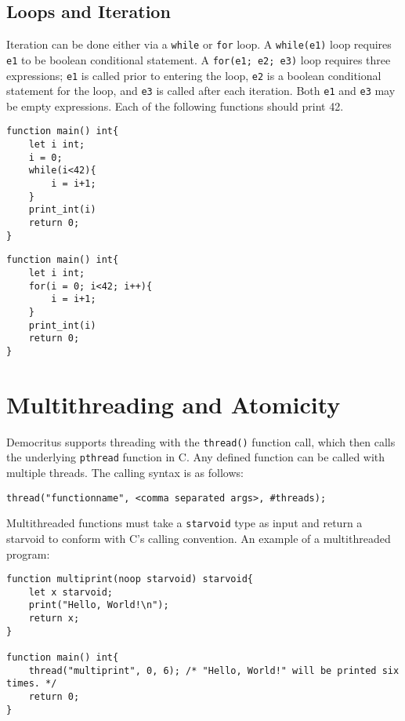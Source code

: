	\subsection{Loops and Iteration}
		Iteration can be done either via a \texttt{while} or \texttt{for} loop. A \texttt{while(e1)} loop requires \texttt{e1} to be boolean conditional statement. A \texttt{for(e1; e2; e3)} loop requires three expressions; \texttt{e1} is called prior to entering the loop, \texttt{e2} is a boolean conditional statement for the loop, and \texttt{e3} is called after each iteration. Both \texttt{e1} and \texttt{e3} may be empty expressions. Each of the following functions should print 42.

		\begin{lstlisting}
function main() int{
	let i int;
	i = 0;
	while(i<42){
		i = i+1;
	}
	print_int(i)
	return 0;
}
		\end{lstlisting}

		\begin{lstlisting}
function main() int{
	let i int;
	for(i = 0; i<42; i++){
		i = i+1;
	}
	print_int(i)
	return 0;
}
		\end{lstlisting}



\section{Multithreading and Atomicity}
	Democritus supports threading with the \texttt{thread()} function call, which then calls the underlying \texttt{pthread} function in C. Any defined function can be called with multiple threads. The calling syntax is as follows:
	\begin{lstlisting}
thread("functionname", <comma separated args>, #threads);
	\end{lstlisting}

	\noindent
	Multithreaded functions must take a \texttt{starvoid} type as input and return a starvoid to conform with C's calling convention. An example of a multithreaded program:

	\begin{lstlisting}
function multiprint(noop starvoid) starvoid{
	let x starvoid;
	print("Hello, World!\n");
	return x;
}

function main() int{
	thread("multiprint", 0, 6); /* "Hello, World!" will be printed six times. */
	return 0;
}

	\end{lstlisting}



